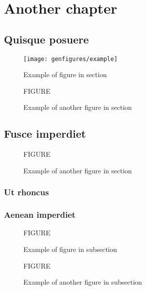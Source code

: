 \chapter{Another chapter}

\minitoc[n] %

\lipsum[1-2]

\section{Quisque posuere}

\lipsum[1]

\begin{figure}[hbtp]
  \centering
  \texttt{[image: genfigures/example]}
  \caption{Example of figure in section}
  \label{fig:A}
\end{figure}

\begin{figure}[hbtp]
  \centering FIGURE
  \caption[Mini test]{Example of another figure in section}
  \label{fig:B}
\end{figure}

\lipsum[1-1]

\section{Fusce imperdiet}

\lipsum[1-1]

\begin{figure}[hbtp]
  \centering FIGURE
  \caption{Example of another figure in section}
  \label{fig:C}
\end{figure}

\lipsum[1-1]

\subsection{Ut rhoncus}

\lipsum[1-2]

\subsection{Aenean imperdiet}

\lipsum[1-2]

\begin{figure}[hbtp]
  \centering FIGURE
  \caption{Example of figure in subsection}
  \label{fig:D}
\end{figure}

\begin{figure}[hbtp]
  \centering FIGURE
  \caption{Example of another figure in subsection}
  \label{fig:E}
\end{figure}

